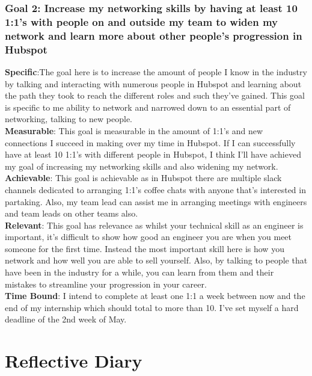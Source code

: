 \documentclass[11pt]{article} %
\begin{document}
\subsubsection{Goal 2: Increase my networking skills by having at least 10 1:1's with people on and outside my team to widen my network and learn more about other people's progression in Hubspot}
\textbf{Specific}:The goal here is to increase the amount of people I know in the industry by talking and interacting with numerous people in Hubspot and learning about the path they took to reach the different roles and such they've gained. This goal is specific to me ability to network and narrowed down to an essential part of networking,  talking to new people. 
\\ \textbf{Measurable}: This goal is measurable in the amount of 1:1's and new connections I succeed in making over my time in Hubspot.  If I can successfully have at least 10 1:1's with different people in Hubspot,  I think I'll have achieved my goal of increasing my networking skills and also widening my network.
\\ \textbf{Achievable}: This goal is achievable as in Hubspot there are multiple slack channels dedicated to arranging 1:1's coffee chats with anyone that's interested in partaking.  Also,  my team lead can assist me in arranging meetings with engineers and team leads on other teams also.
\\ \textbf{Relevant}: This goal has relevance as whilst your technical skill as an engineer is important,  it's difficult to show how good an engineer you are when you meet someone for the first time.  Instead the most important skill here is how you network and how well you are able to sell yourself.  Also, by talking to people that have been in the industry for a while,  you can learn from them and their mistakes to streamline your progression in your career. 
\\ \textbf{Time Bound}: I intend to complete at least one 1:1  a week between now and the end of my internship which should total to more than 10.  I've set myself a hard deadline of the 2nd week of May. 
\section{Reflective Diary}
\end{document}
